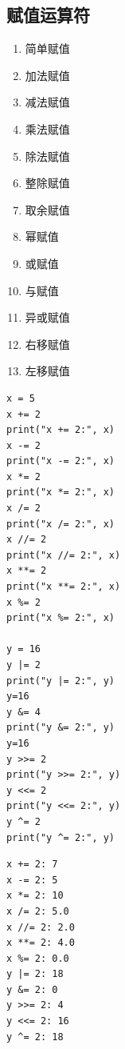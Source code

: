 \subsection{赋值运算符}
\begin{enumerate}[label=\arabic*)]
    \item \codeinline{=} 简单赋值
    \item \codeinline{+=} 加法赋值
    \item \codeinline{-=} 减法赋值
    \item \codeinline{*=} 乘法赋值
    \item \codeinline{/=} 除法赋值
    \item \codeinline{//=} 整除赋值
    \item \codeinline{\%=} 取余赋值
    \item \codeinline{**=} 幂赋值
    \item \codeinline{|=} 或赋值
    \item \codeinline{\&=} 与赋值
    \item \codeinline{\textasciicircum{}=} 异或赋值
    \item \codeinline{>>=} 右移赋值
    \item \codeinline{<<=} 左移赋值
\end{enumerate}
\begin{lstlisting}[style=pythonstyle]
x = 5
x += 2
print("x += 2:", x)
x -= 2
print("x -= 2:", x)
x *= 2
print("x *= 2:", x)
x /= 2
print("x /= 2:", x)
x //= 2
print("x //= 2:", x)
x **= 2
print("x **= 2:", x)
x %= 2
print("x %= 2:", x)

y = 16
y |= 2
print("y |= 2:", y)
y=16
y &= 4
print("y &= 2:", y)
y=16
y >>= 2
print("y >>= 2:", y)
y <<= 2
print("y <<= 2:", y)
y ^= 2
print("y ^= 2:", y)
\end{lstlisting}
\begin{lstlisting}[style=demostyle,numbers=none]
x += 2: 7
x -= 2: 5
x *= 2: 10
x /= 2: 5.0
x //= 2: 2.0
x **= 2: 4.0
x %= 2: 0.0
y |= 2: 18
y &= 2: 0
y >>= 2: 4
y <<= 2: 16
y ^= 2: 18
\end{lstlisting}

